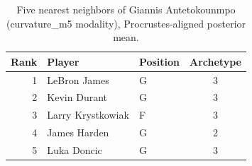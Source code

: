 \begin{table}[htbp]
  \centering\small
  \begin{tabular}{rllc}
    \toprule
    Rank & Player & Position & Archetype \\
    \midrule
    1 & LeBron James & G & 3 \\
    2 & Kevin Durant & G & 3 \\
    3 & Larry Krystkowiak & F & 3 \\
    4 & James Harden & G & 2 \\
    5 & Luka Doncic & G & 3 \\
    \bottomrule
  \end{tabular}
  \caption{Five nearest neighbors of Giannis Antetokounmpo (curvature_m5 modality), Procrustes-aligned posterior mean.}
  \label{tab:Giannis_Antetokounmpo_neighbors_curvature_m5}
\end{table}

